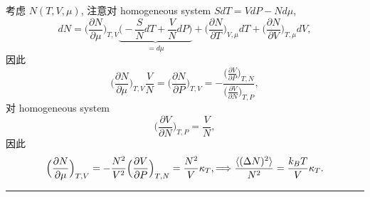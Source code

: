 \begin{itemize}
	\begin{tcolorbox}[title=calculation:]
		考虑 $N(T, V, \mu)$, 注意对 homogeneous system $S dT = V dP - N d\mu$,
		\begin{equation}
			dN = \Big( \frac{\partial N}{\partial \mu} \Big)_{T, V} \underbrace{\Big( - \frac{S}{N} dT + \frac{V}{N} dP \Big)}_{= d\mu} + \Big( \frac{\partial N}{\partial T} \Big)_{V, \mu} dT + \Big( \frac{\partial N}{\partial V} \Big)_{T, \mu} dV,
		\end{equation}
		因此
		\begin{equation}
			\Big( \frac{\partial N}{\partial \mu} \Big)_{T, V} \frac{V}{N} = \Big( \frac{\partial N}{\partial P} \Big)_{T, V} = - \frac{\big( \frac{\partial V}{\partial P} \big)_{T, N}}{\big( \frac{\partial V}{\partial N} \big)_{T, P}},
		\end{equation}
		对 homogeneous system
		\begin{equation}
			\Big( \frac{\partial V}{\partial N} \Big)_{T, P} = \frac{V}{N},
		\end{equation}
		因此
		\begin{equation}
			\Big( \frac{\partial N}{\partial \mu} \Big)_{T, V} = - \frac{N^2}{V^2} \Big( \frac{\partial V}{\partial P} \Big)_{T, N} = \frac{N^2}{V} \kappa_T, \Longrightarrow \frac{\braket{(\Delta N)^2}}{N^2} = \frac{k_B T}{V} \kappa_T.
		\end{equation}
		
		\noindent\rule[0.5ex]{\linewidth}{0.5pt} %
		

\end{tcolorbox}
\end{itemize}

